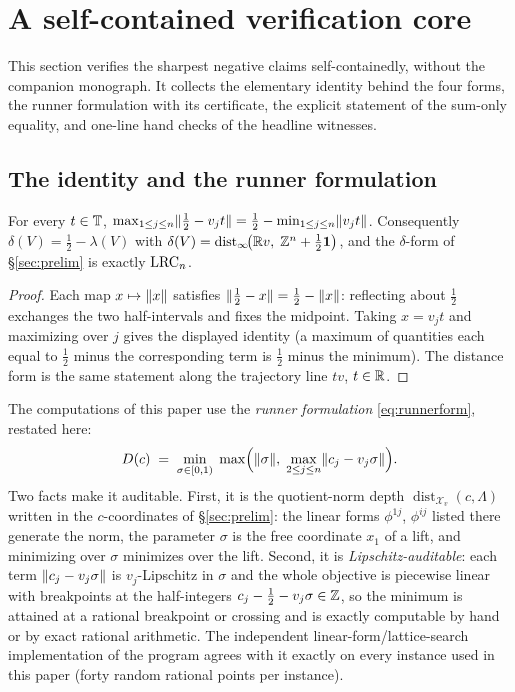 
\section{A self-contained verification core}\label{si:sec:self}

This section verifies the sharpest negative claims self-containedly,
without the companion monograph. It collects the elementary identity
behind the four forms, the runner formulation with its certificate, the
explicit statement of the sum-only equality, and one-line hand checks of
the headline witnesses.

\subsection{The identity and the runner formulation}

\begin{lemma}\label{si:lem:depthid}
For every $t\in\mathbb{T}$,
$\max_{1\le j\le n}\lVert \tfrac12-v_jt \rVert=\tfrac12-\min_{1\le j\le n}\lVert v_jt \rVert$.
Consequently $\delta(V)=\tfrac12-\lambda(V)$ with
$\delta(V)=\operatorname{dist}_\infty\!\bigl(\mathbb{R} v,\;\mathbb{Z}^n+\tfrac12\mathbf{1}
\bigr)$, and the $\delta$-form of \S\ref{sec:prelim} is exactly
$\mathrm{LRC}_n$.
\end{lemma}

\begin{proof}
Each map $x\mapsto\lVert x \rVert$ satisfies
$\lVert \tfrac12-x \rVert=\tfrac12-\lVert x \rVert$: reflecting about $\tfrac12$
exchanges the two half-intervals and fixes the midpoint. Taking $x=v_jt$
and maximizing over $j$ gives the displayed identity (a maximum of
quantities each equal to $\tfrac12$ minus the corresponding term is
$\tfrac12$ minus the minimum). The distance form is the same statement
along the trajectory line $tv$, $t\in\mathbb{R}$.
\end{proof}

The computations of this paper use the \emph{runner formulation}
\eqref{eq:runnerform}, restated here:
\[
D(c)\;=\;\min_{\sigma\in[0,1)}\;\max\Bigl(\lVert \sigma \rVert,\;
\max_{2\le j\le n}\lVert c_j-v_j\sigma \rVert\Bigr).
\]
Two facts make it auditable. First, it is the quotient-norm depth
$\operatorname{dist}_{\mathcal{X}_v}(c,\Lambda)$ written in the
$c$-coordinates of \S\ref{sec:prelim}: the linear forms $\phi^{1j}$,
$\phi^{ij}$ listed there generate the norm, the parameter $\sigma$ is the
free coordinate $x_1$ of a lift, and minimizing over $\sigma$ minimizes
over the lift. Second, it is \emph{Lipschitz-auditable}: each term
$\lVert c_j-v_j\sigma \rVert$ is $v_j$-Lipschitz in $\sigma$ and the whole
objective is piecewise linear with breakpoints at the half-integers
$c_j-\tfrac12-v_j\sigma\in\mathbb{Z}$, so the minimum is attained at a rational
breakpoint or crossing and is exactly computable by hand or by exact
rational arithmetic. The independent linear-form/lattice-search
implementation of the program agrees with it exactly on every instance
used in this paper (forty random rational points per instance).

